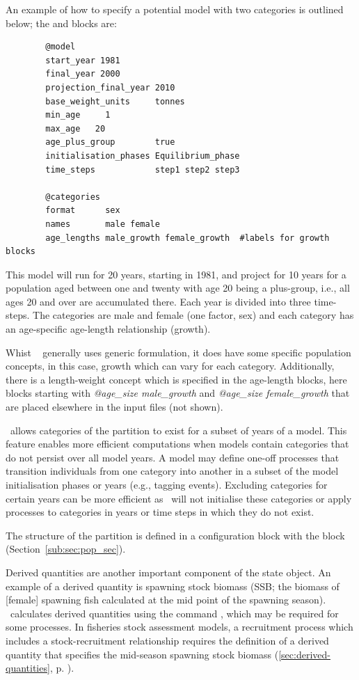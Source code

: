An example of how to specify a potential model with two categories is outlined below;  the  and  blocks are:

{\small{\begin{verbatim}
		@model
		start_year 1981
		final_year 2000
		projection_final_year 2010
		base_weight_units     tonnes
		min_age     1
		max_age   20
		age_plus_group        true
		initialisation_phases Equilibrium_phase
		time_steps            step1 step2 step3
		
		@categories
		format      sex
		names       male female
		age_lengths male_growth female_growth  #labels for growth blocks
\end{verbatim}}}

This model will run for 20 years, starting in 1981, and project for 10 years for a population aged between one and twenty with age 20 being a plus-group, i.e., all ages 20 and over are accumulated there. Each year is divided into three time-steps. The categories are male and female (one factor, sex) and each category has an age-specific age-length relationship (growth).

Whist \CNAME~  generally uses generic formulation, it does have some specific population concepts, in this case, growth which can vary for each category. Additionally, there is a  length-weight concept which is specified in the age-length blocks, here blocks starting with \textit{@age\_size male\_growth} and \textit{@age\_size female\_growth} that are placed elsewhere in the input files (not shown). 
 
\CNAME~allows categories of the partition to exist for a subset of years of a model. This feature enables more efficient computations when models contain categories that do not persist over all model years. A model may define one-off processes that transition individuals from one category into another in a subset of the model initialisation phases or years (e.g., tagging events). Excluding categories for certain years can be more efficient as \CNAME~will not initialise these categories or apply processes to categories in years or time steps in which they do not exist.

The structure of the partition is defined in a configuration block with the  block (Section~\ref{sub:sec:pop_sec}).

Derived quantities are another important component of the state object. An example of a derived quantity is spawning stock biomass (SSB; the biomass of [female] spawning fish calculated at the mid point of the spawning season). \CNAME~calculates derived quantities using the command , which may be required for some processes. In fisheries stock assessment models, a recruitment process which includes a stock-recruitment relationship requires the definition of a derived quantity that specifies the mid-season spawning stock biomass (\ref{sec:derived-quantities}, p. \pageref{sec:derived-quantities}). 

